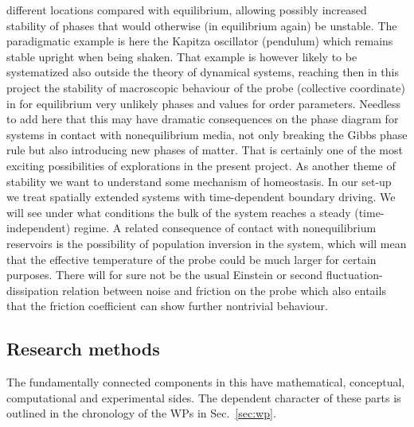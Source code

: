 different locations compared with equilibrium, allowing possibly increased stability of
phases that would otherwise (in equilibrium again) be unstable.  The paradigmatic example is
here the Kapitza oscillator (pendulum) which remains stable upright when being shaken.  That
example is however likely to be systematized also outside the theory of dynamical systems,
reaching then in this project the stability of macroscopic behaviour of the probe
(collective coordinate) in for equilibrium very unlikely phases and values for order
parameters.  Needless to add here that this may have dramatic consequences on the phase
diagram for systems in contact with nonequilibrium media, not only breaking the Gibbs phase
rule but also introducing new phases of matter.  That is certainly one of the most exciting
possibilities of explorations in the present project. As another theme of stability we want
to understand some mechanism of homeostasis. In our set-up we treat spatially extended
systems with time-dependent boundary driving. We will see under what conditions the bulk of
the system reaches a steady (time-independent) regime. A related consequence of contact with
nonequilibrium reservoirs is the possibility of population inversion in the system, which
will mean that the effective temperature of the probe could be much larger for certain
purposes.  There will for sure not be the usual Einstein or second fluctuation-dissipation
relation between noise and friction on the probe which also entails that the friction
coefficient can show further nontrivial behaviour.  


\subsection{Research methods}\label{sec:methods}

The fundamentally connected components in this \TheProject have mathematical, conceptual,
computational and experimental sides. The dependent character of these parts is outlined in
the chronology of the WPs in Sec.~\ref{sec:wp}.

